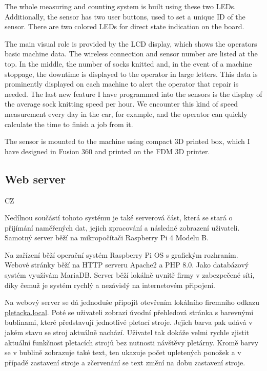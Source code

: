 \documentclass[12pt, a4paper]{article}
\begin{document}
The whole measuring and counting system is built using these two LEDs.
Additionally, the sensor has two user buttons, used to set a unique ID of the sensor.
There are two colored LEDs for direct state indication on the board.

The main visual role is provided by the LCD display, which shows the operators basic machine data.
The wireless connection and sensor number are listed at the top.
In the middle, the number of socks knitted and, in the event of a machine stoppage, the downtime is displayed to the operator in large letters.
This data is prominently displayed on each machine to alert the operator that repair is needed.
The last new feature I have programmed into the sensors is the display of the average sock knitting speed per hour.
We encounter this kind of speed measurement every day in the car, for example, and the operator can quickly calculate the time to finish a job from it.

The sensor is mounted to the machine using compact 3D printed box, which I have designed in Fusion 360 and printed on the FDM 3D printer.

\subsection*{Web server}

CZ

Nedílnou součástí tohoto systému je také serverová část, která se stará o přijímání naměřených dat, jejich zpracování a následné zobrazení uživateli.
Samotný server běží na mikropočítači Raspberry Pi 4 Modelu B.

Na zařízení běží operační systém Raspberry Pi OS s grafickým rozhraním.
Webové stránky běží na HTTP serveru Apache2 a PHP 8.0.
Jako databázový systém využívám MariaDB.
Server běží lokálně uvnitř firmy v zabezpečené síti, díky čemuž je systém rychlý a nezávislý na internetovém připojení.

Na webový server se dá jednoduše připojit otevřením lokálního firemního odkazu \newline\href{http://pletacka.local}{pletacka.local}.
Poté se uživateli zobrazí úvodní přehledová stránka s barevnými bublinami, které představují jednotlivé pletací stroje.
Jejich barva pak udává v jakém stavu se stroj aktuálně nachází. Uživatel tak dokáže velmi rychle zjistit aktuální funkčnost pletacích strojů bez nutnosti návštěvy pletárny.
Kromě barvy se v bublině zobrazuje také text, ten ukazuje počet upletených ponožek a v případě zastavení stroje a zčervenání se text změní na dobu zastavení stroje.
\end{document}
